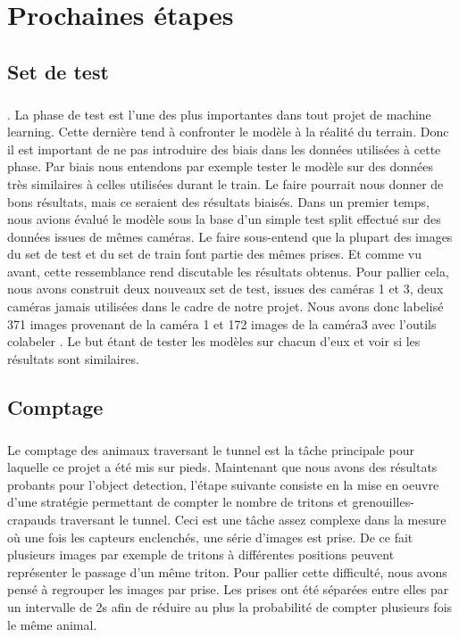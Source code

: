 \chapter{Prochaines étapes}\label{chap:next_steps}
\section{Set de test}
\paragraph{}.
La phase de test est l’une des plus importantes dans tout projet de machine learning.  Cette dernière tend à confronter le modèle à la réalité du terrain. Donc il est important de ne pas introduire des biais dans les données utilisées à cette phase. Par biais nous entendons par exemple tester le modèle sur des données très similaires à celles utilisées durant le train. Le faire pourrait nous donner de bons résultats, mais ce seraient des résultats biaisés.
Dans un premier temps, nous avions évalué le modèle sous la base d’un simple test split effectué sur des données issues de mêmes caméras. Le faire sous-entend que la plupart des images du set de test et du set de train font partie des mêmes prises. Et comme vu avant,  cette ressemblance rend discutable les résultats obtenus.  Pour pallier cela, nous avons construit deux nouveaux set de test, issues des caméras 1 et 3, deux caméras jamais utilisées dans le cadre de notre projet. Nous avons donc labelisé 371 images provenant de la caméra 1  et 172 images de la caméra3 avec l’outils colabeler . Le but étant  de tester les modèles sur chacun d’eux et voir si les résultats sont similaires.

\section{Comptage}\label{anal:comptage}
\paragraph{} Le comptage des animaux traversant le tunnel est la tâche principale pour laquelle ce projet a été mis sur pieds. Maintenant que nous avons des résultats probants pour l'object detection, l'étape suivante consiste en la mise en oeuvre d'une stratégie permettant de compter le nombre de tritons et grenouilles-crapauds traversant le tunnel. Ceci est une tâche assez complexe dans la mesure où une fois les capteurs enclenchés, une série d'images est prise. De ce fait plusieurs images par exemple de tritons à différentes positions peuvent représenter le passage d'un même triton. Pour pallier cette difficulté, nous avons pensé à regrouper les images par prise. Les prises ont été séparées entre elles par un intervalle de 2s afin de réduire au plus la probabilité de compter plusieurs fois le même animal. 

